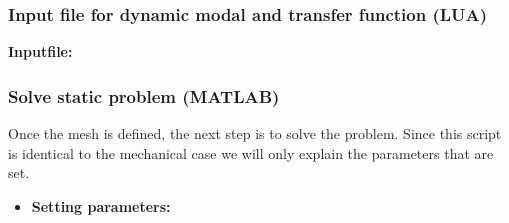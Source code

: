 \clearpage
\subsubsection*{Input file for dynamic modal and transfer function (LUA)}
\begin{flushleft}
  \textbf{Inputfile:}
  \\
\end{flushleft}
\hspace{1in}
{\footnotesize
{}
}

\clearpage
\subsubsection*{Solve static problem (MATLAB)}
Once the mesh is defined, the next step is to solve the problem.
Since this script is identical to the mechanical case we will only 
explain the parameters that are set.
\begin{itemize}

  \item{\textbf{Setting parameters:}}

\end{itemize}

